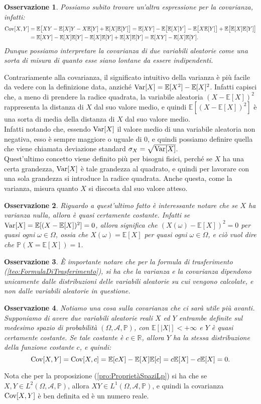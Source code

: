 \documentclass[11pt]{book}
\theoremstyle{Definizione}
\theoremstyle{TeoremaProposizioneLemmaCorollario}
\theoremstyle{OsservazioneNota}
\newtheorem{myobs}{Osservazione}[section]
\newcommand{\R}{\mathbb{R}}
\renewcommand{\P}{\mathbb{P}}
\newcommand{\E}{\mathbb{E}}
\newcommand{\Cov}{\textup{Cov}}
\newcommand{\Var}{\textup{Var}}
\begin{document}
\begin{myobs}
Possiamo subito trovare un'altra espressione per la covarianza, infatti:
\begin{align*}
\Cov[X,Y] &= \E\big[XY-\E[X]Y-X\E[Y]+\E[X]\E[Y]\big] = \E[XY]-\E\big[\E[X]Y\big]-\E\big[X\E[Y]\big]+\E\big[\E[X]\E[Y]\big]\\
&= \E[XY] - \E[X]\E[Y]-\E[X]\E[Y]+\E[X]\E[Y] = \E[XY]-\E[X]\E[Y].
\end{align*}
Dunque possiamo interpretare la covarianza di due variabili aleatorie come una sorta di misura di quanto esse siano lontane da essere indipendenti.
\end{myobs}
Contrariamente alla covarianza, il significato intuitivo della varianza è più facile da vedere con la definizione data, anziché $\Var[X] =\E[X^2]-\E[X]^2$. Infatti capisci che, a meno di prendere la radice quadrata, la variabile aleatoria $(X-\E[X])^2$ rappresenta la distanza di $X$ dal suo valore medio, e quindi $\E[(X-\E[X])^2]$ è una sorta di media della distanza di $X$ dal suo valore medio.\\
Infatti notando che, essendo $\Var[X]$ il valore medio di una variabile aleatoria non negativa, esso è sempre maggiore o uguale di $0$, e quindi possiamo definire quella che viene chiamata deviazione standard $\sigma_X = \sqrt{\Var[X]}$.\\
Quest'ultimo concetto viene definito più per bisogni fisici, perché se $X$ ha una certa grandezza, $\Var[X]$ è tale grandezza al quadrato, e quindi per lavorare con una sola grandezza si introduce la radice quadrata. Anche questa, come la varianza, misura quanto $X$ si discosta dal suo valore atteso.
\begin{myobs}
Riguardo a quest'ultimo fatto è interessante notare che se $X$ ha varianza nulla, allora è quasi certamente costante. Infatti se $\Var[X] = \E[(X-\E[X])^2] = 0$, allora significa che $(X(\omega)-\E[X])^2 = 0$ per quasi ogni $\omega\in \Omega$, ossia che $X(\omega) = \E[X]$ per quasi ogni $\omega\in \Omega$, e ciò vuol dire che $\P(X = \E[X]) = 1$.
\end{myobs}
\begin{myobs}
È importante notare che per la formula di trasferimento (\ref{teo:FormulaDiTrasferimento}), si ha che la varianza e la covarianza dipendono unicamente dalle distribuzioni delle variabili aleatorie su cui vengono calcolate, e non dalle variabili aleatorie in questione.
\end{myobs}
\begin{myobs}\label{obs:VAqcCostanti scorrelazione}
Notiamo una cosa sulla covarianza che ci sarà utile più avanti. Supponiamo di avere due variabili aleatorie reali $X$ ed $Y$ entrambe definite sul medesimo spazio di probabilità $(\Omega,\mathcal{A},\P)$, con $\E[|X|]< +\infty$ e $Y$ è quasi certamente costante. Se tale costante è $c\in \R$, allora $Y$ ha la stessa distribuzione della funzione costante $c$, e quindi:
$$
\Cov[X,Y] = \Cov[X,c] = \E[cX]-\E[X]\E[c] = c\E[X]-c\E[X] =  0.
$$
\end{myobs}
Nota che per la proposizione (\ref{pro:ProprietàSpaziLp}) si ha che se $X,Y\in L^2(\Omega,\mathcal{A},\P)$, allora $XY\in L^1(\Omega,\mathcal{A},\P)$, e quindi la covarianza $\Cov[X,Y]$ è ben definita ed è un numero reale.
\end{document}
